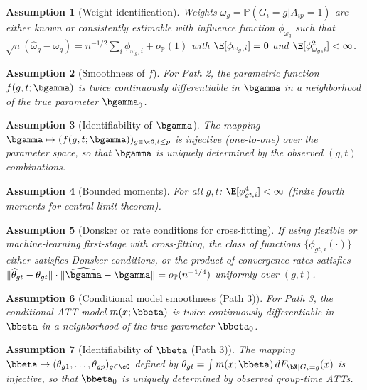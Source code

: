 \documentclass{article}
\newtheorem{assumption}{Assumption}
\renewcommand{\P}{\mathbb{P}}
\begin{document}
\begin{assumption}[Weight identification]\label{RC3}
Weights $\omega_g = \P(G_i = g | A_{ip} = 1)$ are either known or consistently estimable with influence function $\phi_{\omega_g}$ such that $\sqrt{n}(\widehat{\omega}_g - \omega_g) = n^{-1/2}\sum_i \phi_{\omega_g,i} + o_{\P}(1)$ with $\E[\phi_{\omega_g,i}] = 0$ and $\E[\phi_{\omega_g,i}^2] < \infty$.
\end{assumption}

\begin{assumption}[Smoothness of $f$]\label{RC4}
For Path 2, the parametric function $f(g,t;\bgamma)$ is twice continuously differentiable in $\bgamma$ in a neighborhood of the true parameter $\bgamma_0$.
\end{assumption}

\begin{assumption}[Identifiability of $\bgamma$]\label{RC5}
The mapping $\bgamma \mapsto (f(g,t;\bgamma))_{g \in \cG, t \leq p}$ is injective (one-to-one) over the parameter space, so that $\bgamma$ is uniquely determined by the observed $(g,t)$ combinations.
\end{assumption}

\begin{assumption}[Bounded moments]\label{RC6}
For all $g,t$: $\E[\phi_{gt,i}^4] < \infty$ (finite fourth moments for central limit theorem).
\end{assumption}

\begin{assumption}[Donsker or rate conditions for cross-fitting]\label{RC7}
If using flexible or machine-learning first-stage with cross-fitting, the class of functions $\{\phi_{gt,i}(\cdot)\}$ either satisfies Donsker conditions, or the product of convergence rates satisfies $\|\widehat{\theta}_{gt} - \theta_{gt}\| \cdot \|\widehat{\bgamma} - \bgamma\| = o_{\P}(n^{-1/4})$ uniformly over $(g,t)$.
\end{assumption}

\begin{assumption}[Conditional model smoothness (Path 3)]\label{RC8}
For Path 3, the conditional ATT model $m(x;\bbeta)$ is twice continuously differentiable in $\bbeta$ in a neighborhood of the true parameter $\bbeta_0$.
\end{assumption}

\begin{assumption}[Identifiability of $\bbeta$ (Path 3)]\label{RC9}
The mapping $\bbeta \mapsto (\theta_{g1}, \ldots, \theta_{gp})_{g \in \cG}$ defined by $\theta_{gt} = \int m(x;\bbeta) \, dF_{\bX|G_i=g}(x)$ is injective, so that $\bbeta_0$ is uniquely determined by observed group-time ATTs.
\end{assumption}
\end{document}
